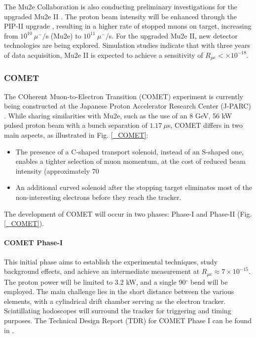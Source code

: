 \begin{refsection}
        \noindent
        The Mu2e Collaboration is also conducting preliminary investigations for the upgraded Mu2e II \cite{Mu2e_II:2018}. 
        The proton beam intensity will be enhanced through the PIP-II upgrade \cite{PIP_II:2018}, resulting in a higher rate of stopped muons on target, increasing from $10^{10}\ \mu^-/$s (Mu2e) to $10^{11}\ \mu^-/$s. For the upgraded Mu2e II, new detector technologies are being explored. 
        Simulation studies indicate that with three years of data acquisition, Mu2e II is expected to achieve a sensitivity of $R_{\mu e} < \times10^{-18}$.

        \subsubsection{COMET}
        The COherent Muon-to-Electron Transition (COMET) experiment is currently being constructed at the Japanese Proton Accelerator Research Center (J-PARC) \cite{COMET_I}. 
While sharing similarities with Mu2e, such as the use of an 8 GeV, 56 kW pulsed proton beam with a bunch separation of $1.17\ \mu$s, COMET differs in two main aspects, as illustrated in Fig. \ref{_COMET}:
\begin{itemize}
    \item The presence of a C-shaped transport solenoid, instead of an S-shaped one, enables a tighter selection of muon momentum, at the cost of reduced beam intensity (approximately 70%
    \item An additional curved solenoid after the stopping target eliminates most of the non-interesting electrons before they reach the tracker.
\end{itemize}
The development of COMET will occur in two phases: Phase-I and Phase-II (Fig. \ref{_COMET}).
\paragraph{COMET Phase-I}
This initial phase aims to establish the experimental techniques, study background effects, and achieve an intermediate measurement at $R_{\mu e}\approx7\times10^{-15}$. The proton power will be limited to 3.2 kW, and a single 90$^\circ$ bend will be employed. The main challenge lies in the short distance between the various elements, with a cylindrical drift chamber serving as the electron tracker. Scintillating hodoscopes will surround the tracker for triggering and timing purposes. The Technical Design Report (TDR) for COMET Phase I can be found in \cite{COMET_I}.

\end{refsection}
